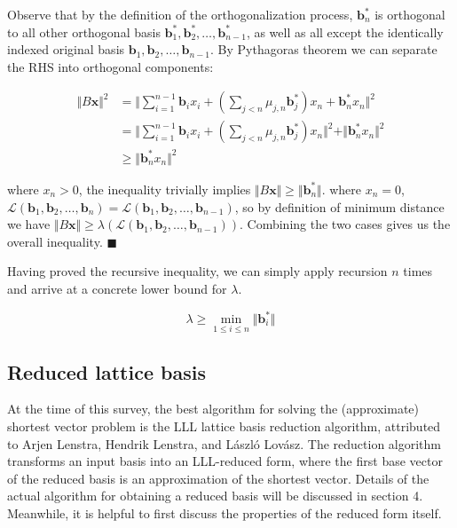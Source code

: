 \documentclass[letterpaper,12pt]{article}
\begin{document}
Observe that by the definition of the orthogonalization process, $\mathbf{b}_n^\ast$ is orthogonal to all other orthogonal basis $\mathbf{b}_1^\ast, \mathbf{b}_2^\ast, \ldots, \mathbf{b}_{n-1}^\ast$, as well as all except the identically indexed original basis $\mathbf{b}_1, \mathbf{b}_2, \ldots, \mathbf{b}_{n-1}$. By Pythagoras theorem we can separate the RHS into orthogonal components:

$$
\begin{aligned}
\Vert B\mathbf{x} \Vert^2 
&= \Vert \sum_{i=1}^{n-1}\mathbf{b}_ix_i + (\sum_{j<n}\mu_{j, n}\mathbf{b}_j^\ast) x_n  + \mathbf{b}_n^\ast x_n\Vert^2 \\
&= \Vert \sum_{i=1}^{n-1}\mathbf{b}_ix_i + (\sum_{j<n}\mu_{j, n}\mathbf{b}_j^\ast) x_n \Vert^2 + \Vert \mathbf{b}_n^\ast x_n \Vert^2 \\
&\geq \Vert \mathbf{b}_n^\ast x_n \Vert^2
\end{aligned}
$$

where $x_n > 0$, the inequality trivially implies $\Vert B\mathbf{x} \Vert \geq \Vert\mathbf{b}_n^\ast\Vert$. where $x_n = 0$, $\mathcal{L}(\mathbf{b}_1, \mathbf{b}_2, \ldots, \mathbf{b}_n) = \mathcal{L}(\mathbf{b}_1, \mathbf{b}_2, \ldots, \mathbf{b}_{n-1})$, so by definition of minimum distance we have $\Vert B\mathbf{x} \Vert \geq \lambda(\mathcal{L}(\mathbf{b}_1, \mathbf{b}_2, \ldots, \mathbf{b}_{n-1}))$. Combining the two cases gives us the overall inequality. $\blacksquare$

Having proved the recursive inequality, we can simply apply recursion $n$ times and arrive at a concrete lower bound for $\lambda$.

$$
\lambda \geq \min_{1 \leq i \leq n} \Vert \mathbf{b}_i^\ast \Vert
$$

\subsection{Reduced lattice basis}
At the time of this survey, the best algorithm for solving the (approximate) shortest vector problem is the LLL lattice basis reduction algorithm, attributed to Arjen Lenstra, Hendrik Lenstra, and László Lovász. The reduction algorithm transforms an input basis into an LLL-reduced form, where the first base vector of the reduced basis is an approximation of the shortest vector. Details of the actual algorithm for obtaining a reduced basis will be discussed in section 4. Meanwhile, it is helpful to first discuss the properties of the reduced form itself.
\end{document}

